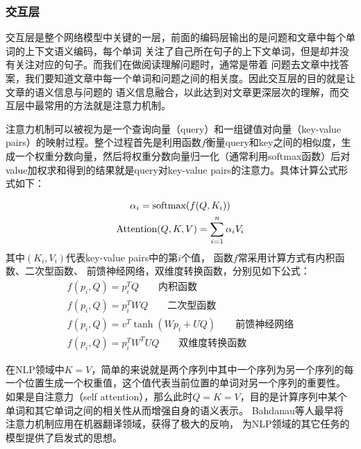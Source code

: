\subsubsection{交互层}
交互层是整个网络模型中关键的一层，前面的编码层输出的是问题和文章中每个单词的上下文语义编码，每个单词
关注了自己所在句子的上下文单词，但是却并没有关注对应的句子。而我们在做阅读理解问题时，通常是带着
问题去文章中找答案，我们要知道文章中每一个单词和问题之间的相关度。因此交互层的目的就是让文章的语义信息与问题的
语义信息融合，以此达到对文章更深层次的理解，而交互层中最常用的方法就是注意力机制。

注意力机制可以被视为是一个查询向量（query）和一组键值对向量（key-value pairs）的映射过程。整个过程首先是利用函数$f$衡量query和key之间的相似度，生成一个权重分数向量，然后将权重分数向量归一化（通常利用softmax函数）后对value加权求和得到的结果就是query对key-value pairs的注意力。具体计算公式形式如下：

\begin{gather}
\alpha_i=\text{softmax}(f(Q,K_i)) \notag \\
\text{Attention}(Q,K,V)=\sum_{i=1}^{n}\alpha_iV_i
\end{gather}
其中$(K_i,V_i)$代表key-value pairs中的第$i$个值，
函数$f$常采用计算方式有内积函数、二次型函数、
前馈神经网络，双维度转换函数，分别见如下公式：
\begin{gather}
f(p_i,Q)=p_i^TQ \qquad \text{内积函数} \\
f(p_i,Q)=p_i^TWQ\qquad \text{二次型函数}\\
f(p_i,Q)=v^T\tanh(Wp_i+UQ)\qquad \text{前馈神经网络} \\
f(p_i,Q)=p_i^TW^TUQ \qquad \text{双维度转换函数}
\end{gather}

在NLP领域中$K=V$，简单的来说就是两个序列中其中一个序列为另一个序列的每一个位置生成一个权重值，这个值代表当前位置的单词对另一个序列的重要性。
如果是自注意力（self attention），那么此时$Q=K=V$，目的是计算序列中某个单词和其它单词之间的相关性从而增强自身的语义表示。
Bahdanau等人最早将
注意力机制应用在机器翻译领域，获得了极大的反响，
为NLP领域的其它任务的模型提供了启发式的思想。

